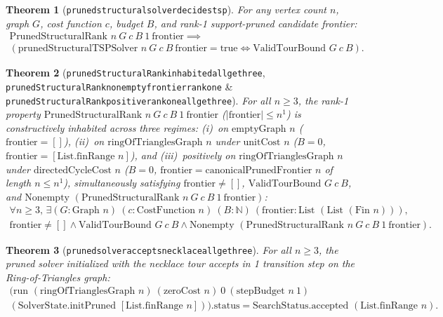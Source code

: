 \documentclass[11pt,a4paper]{article}
\renewcommand{\_}{\origunderscore\allowbreak}
\theoremstyle{plain}
\newtheorem{theorem}{Theorem}[section]
\theoremstyle{definition}
\theoremstyle{remark}
\begin{document}
\begin{theorem}[\texttt{pruned\_structural\_solver\_decides\_tsp}]
For any vertex count $n$, graph $G$, cost function $c$, budget $B$, and rank-1 support-pruned candidate frontier:
\begin{equation*}
\begin{aligned}
  \text{PrunedStructuralRank } n\ G\ c\ B\ 1\ \text{frontier} \implies \\
  (\text{prunedStructuralTSPSolver } n\ G\ c\ B\ \text{frontier} = \text{true} \iff \text{ValidTourBound } G\ c\ B).
\end{aligned}
\end{equation*}
\end{theorem}

\begin{theorem}[\texttt{pruned\allowbreak Structural\allowbreak Rank\_inhabited\_all\_ge\_three}, \texttt{pruned\allowbreak Structural\allowbreak Rank\_nonempty\_frontier\_rank\_one} \& \texttt{pruned\allowbreak Structural\allowbreak Rank\_positive\_rank\_one\_all\_ge\_three}]
For all $n \ge 3$, the rank-1 property $\text{PrunedStructuralRank } n\ G\ c\ B\ 1\ \text{frontier}$ ($|\text{frontier}| \le n^1$) is constructively inhabited across three regimes: (i)~on $\text{emptyGraph } n$ ($\text{frontier} = []$), (ii)~on $\text{ringOfTrianglesGraph } n$ under $\text{unitCost } n$ ($B = 0$, $\text{frontier} = [\text{List.finRange } n]$), and (iii)~positively on $\text{ringOfTrianglesGraph } n$ under $\text{directedCycleCost } n$ ($B = 0$, $\text{frontier} = \text{canonicalPrunedFrontier } n$ of length $n \le n^1$), simultaneously satisfying $\text{frontier} \neq []$, $\text{ValidTourBound } G\ c\ B$, and $\text{Nonempty }(\text{PrunedStructuralRank } n\ G\ c\ B\ 1\ \text{frontier})$:
\begin{equation*}
\begin{aligned}
  \forall n \ge 3,\, \exists (G : \text{Graph } n)\ (c : \text{CostFunction } n)\ (B : \mathbb{N})\ (\text{frontier} : \text{List }(\text{List }(\text{Fin } n))), \\
  \text{frontier} \neq [] \land \text{ValidTourBound } G\ c\ B \land \text{Nonempty }(\text{PrunedStructuralRank } n\ G\ c\ B\ 1\ \text{frontier}).
\end{aligned}
\end{equation*}
\end{theorem}

\begin{theorem}[\texttt{pruned\_solver\_accepts\_necklace\_all\_ge\_three}]
For all $n \ge 3$, the pruned solver initialized with the necklace tour accepts in 1 transition step on the Ring-of-Triangles graph:
\begin{equation*}
\begin{aligned}
  (\text{run } (\text{ringOfTrianglesGraph } n)\ (\text{zeroCost } n)\ 0\ (\text{stepBudget } n\ 1) \qquad \\
  (\text{SolverState.initPruned } [\text{List.finRange } n])).\text{status} = \text{SearchStatus.accepted } (\text{List.finRange } n).
\end{aligned}
\end{equation*}
\end{theorem}
\end{document}
